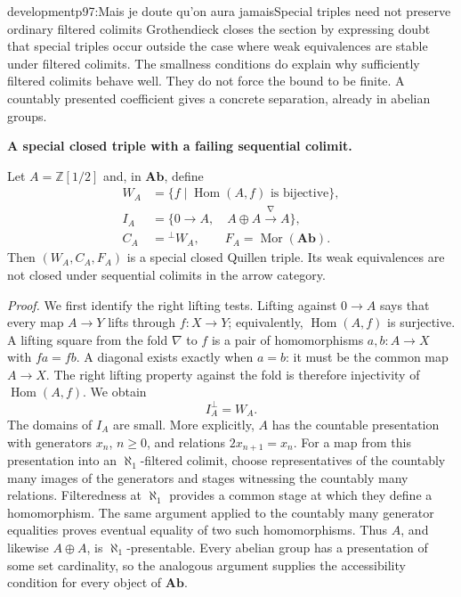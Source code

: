 \begin{dcomment}{development}{p97:Mais je doute qu'on aura jamais}{Special triples need not preserve ordinary filtered colimits}
Grothendieck closes the section by expressing doubt that special triples occur outside the case where weak equivalences are stable under filtered colimits. The smallness conditions do explain why sufficiently filtered colimits behave well. They do not force the bound to be finite. A countably presented coefficient gives a concrete separation, already in abelian groups.

\textbf{A special closed triple with a failing sequential colimit.}\ours\par
Let $A=\mathbb Z[1/2]$ and, in $\mathbf{Ab}$, define
\[
 \begin{split}
 W_A&=\{f\mid\operatorname{Hom}(A,f)\text{ is bijective}\},\\
 I_A&=\{0\longrightarrow A,\quad A\oplus A\xrightarrow{\nabla}A\},\\
 C_A&={}^{\perp}W_A,\qquad F_A=\operatorname{Mor}(\mathbf{Ab}).
 \end{split}
\]
Then $(W_A,C_A,F_A)$ is a special closed Quillen triple. Its weak equivalences are not closed under sequential colimits in the arrow category.

\emph{Proof.} We first identify the right lifting tests. Lifting against $0\to A$ says that every map $A\to Y$ lifts through $f:X\to Y$; equivalently, $\operatorname{Hom}(A,f)$ is surjective. A lifting square from the fold $\nabla$ to $f$ is a pair of homomorphisms $a,b:A\to X$ with $fa=fb$. A diagonal exists exactly when $a=b$: it must be the common map $A\to X$. The right lifting property against the fold is therefore injectivity of $\operatorname{Hom}(A,f)$. We obtain
\[
 I_A^{\perp}=W_A.
\]
The domains of $I_A$ are small. More explicitly, $A$ has the countable presentation with generators $x_n$, $n\geq0$, and relations $2x_{n+1}=x_n$. For a map from this presentation into an $\aleph_1$-filtered colimit, choose representatives of the countably many images of the generators and stages witnessing the countably many relations. Filteredness at $\aleph_1$ provides a common stage at which they define a homomorphism. The same argument applied to the countably many generator equalities proves eventual equality of two such homomorphisms. Thus $A$, and likewise $A\oplus A$, is $\aleph_1$-presentable. Every abelian group has a presentation of some set cardinality, so the analogous argument supplies the accessibility condition for every object of $\mathbf{Ab}$.


\end{dcomment}
